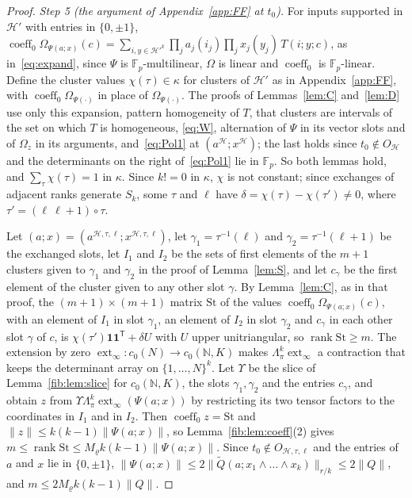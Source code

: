 \documentclass[11pt]{amsart}
\theoremstyle{definition}
\theoremstyle{remark}
\numberwithin{equation}{section}
\newcommand{\N}{\mathbb N}
\newcommand{\F}{\mathbb F}
\newcommand{\norm}[1]{\lVert #1\rVert}
\newcommand{\coeff}{\operatorname{coeff}}
\newcommand{\rank}{\operatorname{rank}}
\theoremstyle{plain}
\theoremstyle{definition}
\theoremstyle{plain}
\begin{document}
\begin{proof}
\emph{Step 5 (the argument of Appendix~\ref{app:FF} at $t_0$).} For inputs supported in $\mathcal H'$ with entries in
$\{0,\pm1\}$,
$\coeff_0\Omega_{\Psi(a;x)}(c)=\sum_{i,y\in\mathcal H'^k}\prod_ja_j(i_j)\prod_jx_j(y_j)\,T(i;y;c)$, as
in~\eqref{eq:expand}, since $\Psi$ is $\F_p$\nobreakdash-multilinear, $\Omega$ is linear and $\coeff_0$ is
$\F_p$\nobreakdash-linear. Define the cluster values $\chi(\tau)\in\kappa$ for clusters of $\mathcal H'$ as in
Appendix~\ref{app:FF}, with $\coeff_0\Omega_{\Psi(\cdot)}$ in place of $\Omega_{\Psi(\cdot)}$. The proofs of
Lemmas~\ref{lem:C} and~\ref{lem:D} use only this expansion, pattern homogeneity of $T$, that clusters are intervals of
the set on which $T$ is homogeneous, \eqref{eq:W}, alternation of $\Psi$ in its vector slots and of $\Omega_z$ in its
arguments, and~\eqref{eq:Pol1} at $(a^{\mathcal H};x^{\mathcal H})$; the last holds since $t_0\notin O_{\mathcal H}$ and
the determinants on the right of~\eqref{eq:Pol1} lie in $\F_p$. So both lemmas hold, and $\sum_\tau\chi(\tau)=1$ in
$\kappa$. Since $k!=0$ in $\kappa$, $\chi$ is not constant; since exchanges of adjacent ranks generate $S_k$, some $\tau$
and $\ell$ have $\delta=\chi(\tau)-\chi(\tau')\ne0$, where $\tau'=(\ell\ \ell{+}1)\circ\tau$.

Let $(a;x)=(a^{\mathcal H,\tau,\ell};x^{\mathcal H,\tau,\ell})$, let $\gamma_1=\tau^{-1}(\ell)$ and
$\gamma_2=\tau^{-1}(\ell+1)$ be the exchanged slots, let $I_1$ and $I_2$ be the sets of first elements of the $m+1$
clusters given to $\gamma_1$ and $\gamma_2$ in the proof of Lemma~\ref{lem:S}, and let $c_\gamma$ be the first element
of the cluster given to any other slot $\gamma$. By Lemma~\ref{lem:C}, as in that proof, the $(m+1)\times(m+1)$ matrix
$\mathrm{St}$ of the values $\coeff_0\Omega_{\Psi(a;x)}(c)$, with an element of $I_1$ in slot $\gamma_1$, an element of
$I_2$ in slot $\gamma_2$ and $c_\gamma$ in each other slot $\gamma$ of $c$, is
$\chi(\tau')\mathbf 1\mathbf 1^{\mathsf T}+\delta U$ with $U$ upper unitriangular, so $\rank\mathrm{St}\ge m$. The
extension by zero $\operatorname{ext}_\infty\colon c_0(N)\to c_0(\N,K)$ makes $\Lambda^k_\pi\operatorname{ext}_\infty$
a contraction that keeps the determinant array on $\{1,\dots,N\}^k$. Let $\Upsilon$ be the slice of
Lemma~\ref{fib:lem:slice} for $c_0(\N,K)$, the slots $\gamma_1,\gamma_2$ and the entries $c_\gamma$, and obtain $z$
from $\Upsilon\Lambda^k_\pi\operatorname{ext}_\infty(\Psi(a;x))$ by restricting its two tensor factors to the
coordinates in $I_1$ and in $I_2$. Then $\coeff_0z=\mathrm{St}$ and $\norm z\le k(k-1)\norm{\Psi(a;x)}$, so
Lemma~\ref{fib:lem:coeff}(2) gives $m\le\rank\mathrm{St}\le M_\varrho k(k-1)\norm{\Psi(a;x)}$. Since
$t_0\notin O_{\mathcal H,\tau,\ell}$ and the entries of $a$ and $x$ lie in $\{0,\pm1\}$,
$\norm{\Psi(a;x)}\le2\norm{\widetilde Q(a;x_1\wedge\dots\wedge x_k)}_{r/k}\le2\norm Q$, and $m\le2M_\varrho k(k-1)\norm Q$.
\end{proof}
\end{document}

